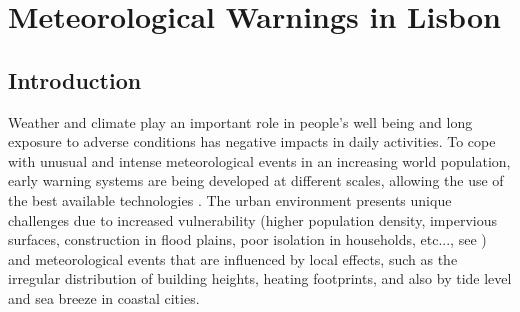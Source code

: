 \chapter{Meteorological Warnings in Lisbon}
\label{sec:warnings}

%
%
%

\section{Introduction}

Weather and climate play an important role in people's well being and long exposure to adverse conditions has negative impacts in daily activities. To cope with unusual and intense meteorological events in an increasing world population, early warning systems are being developed at different scales, allowing the use of the best available technologies \citep{GrassoSingh2008, WMO2010}. The urban environment presents unique challenges due to increased vulnerability (higher population density, impervious surfaces, construction in flood plains, poor isolation in households, etc..., see \cite{SOER2010}) and meteorological events that are influenced by local effects, such as the irregular distribution of building heights, heating footprints, and also by tide level and sea breeze in coastal cities. 


